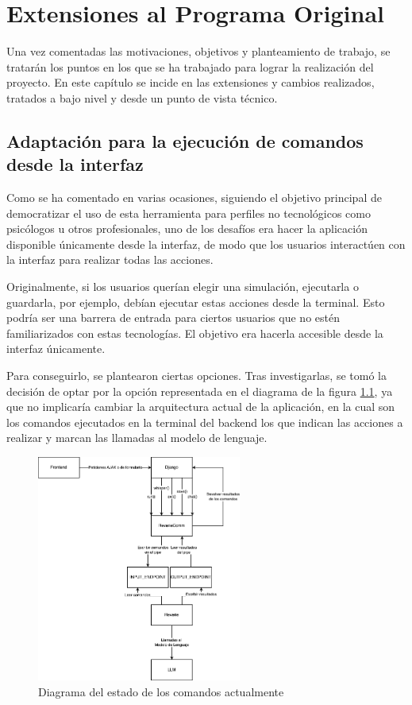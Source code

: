 \chapter{Extensiones al Programa Original}
\label{cap:extensiones}

Una vez comentadas las motivaciones, objetivos y planteamiento de trabajo, se tratarán los puntos en los que se ha trabajado para lograr la realización del proyecto. En este capítulo se incide en las extensiones y cambios realizados, tratados a bajo nivel y desde un punto de vista técnico.

\section{Adaptación para la ejecución de comandos desde la interfaz}

Como se ha comentado en varias ocasiones, siguiendo el objetivo principal de democratizar el uso de esta herramienta para perfiles no tecnológicos como psicólogos u otros profesionales, uno de los desafíos era hacer la aplicación disponible únicamente desde la interfaz, de modo que los usuarios interactúen con la interfaz para realizar todas las acciones.

Originalmente, si los usuarios querían elegir una simulación, ejecutarla o guardarla, por ejemplo, debían ejecutar estas acciones desde la terminal. Esto podría ser una barrera de entrada para ciertos usuarios que no estén familiarizados con estas tecnologías. El objetivo era hacerla accesible desde la interfaz únicamente.

Para conseguirlo, se plantearon ciertas opciones. Tras investigarlas, se tomó la decisión de optar por la opción representada en el diagrama de la figura \ref{fig:DiagramaComandos}, ya que no implicaría cambiar la arquitectura actual de la aplicación, en la cual son los comandos ejecutados en la terminal del backend los que indican las acciones a realizar y marcan las llamadas al modelo de lenguaje.

\begin{figure}[h]
	\centering
	\includegraphics[width = 0.6\textwidth]{Imagenes/Vectorial/DiagramaComandos.png}
	\caption{Diagrama del estado de los comandos actualmente}
	\label{fig:DiagramaComandos}
\end{figure}

